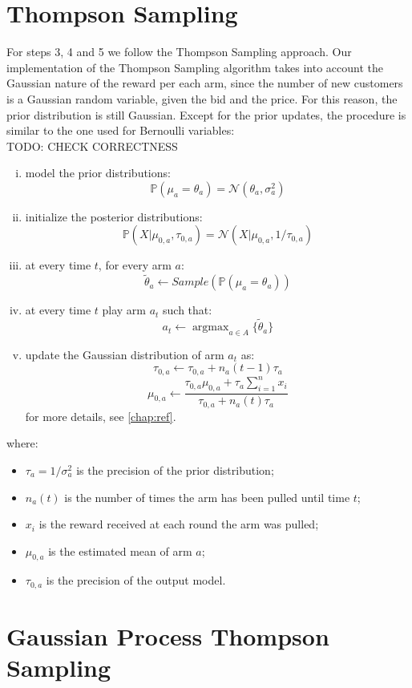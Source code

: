 \documentclass[12pt,a4paper]{report}
\DeclareMathOperator*{\argmax}{argmax}
\begin{document}
		\section{Thompson Sampling}
For steps 3, 4 and 5 we follow the Thompson Sampling approach.
Our implementation of the Thompson Sampling algorithm takes into account the Gaussian nature of the reward per each arm, since the number of new customers is a Gaussian random variable, given the bid and the price. For this reason, the prior distribution is still Gaussian. 
Except for the prior updates, the procedure is similar to the one used for Bernoulli variables:
\\TODO: CHECK CORRECTNESS
\begin{enumerate}[i)]
	\item model the prior distributions: $$\mathbb{P}(\mu_a = \theta_a) = \mathcal{N}(\theta_a, \sigma^2_a)$$
	\item initialize the posterior distributions: $$\mathbb{P}(X|\mu_{0,a}, \tau_{0,a}) = \mathcal{N}(X|\mu_{0,a}, 1/\tau_{0,a}) $$
	\item at every time $t$, for every arm $a$:
\[ \tilde \theta_a \leftarrow Sample\left(\mathbb{P}(\mu_a = \theta_a)\right)\]
	\item at every time $t$ play arm $a_t$ such that:
		$$a_t \leftarrow \argmax_{a \in A} \{\tilde \theta_a\} $$
	\item update the Gaussian distribution of arm $a_t$ as:
		$$\tau_{0,a} \leftarrow \tau_{0,a} + n_a(t-1)\tau_a $$
		$$\mu_{0,a} \leftarrow \frac{\tau_{0,a}\mu_{0,a} + \tau_a \sum_{i=1}^{n}{x_i}}{\tau_{0,a} + n_a(t)\tau_a} $$
		for more details, see \autoref{chap:ref}.
\end{enumerate}
where:
\begin{itemize}
	\item $\tau_a = 1/\sigma^2_a$ is the precision of the prior distribution;
	\item $n_a(t)$ is the number of times the arm has been pulled until time $t$;
	\item $x_i$ is the reward received at each round the arm was pulled;
	\item $\mu_{0,a}$ is the estimated mean of arm $a$;
	\item $\tau_{0,a}$ is the precision of the output model.
\end{itemize}		

\section{Gaussian Process Thompson Sampling}
\end{document}

